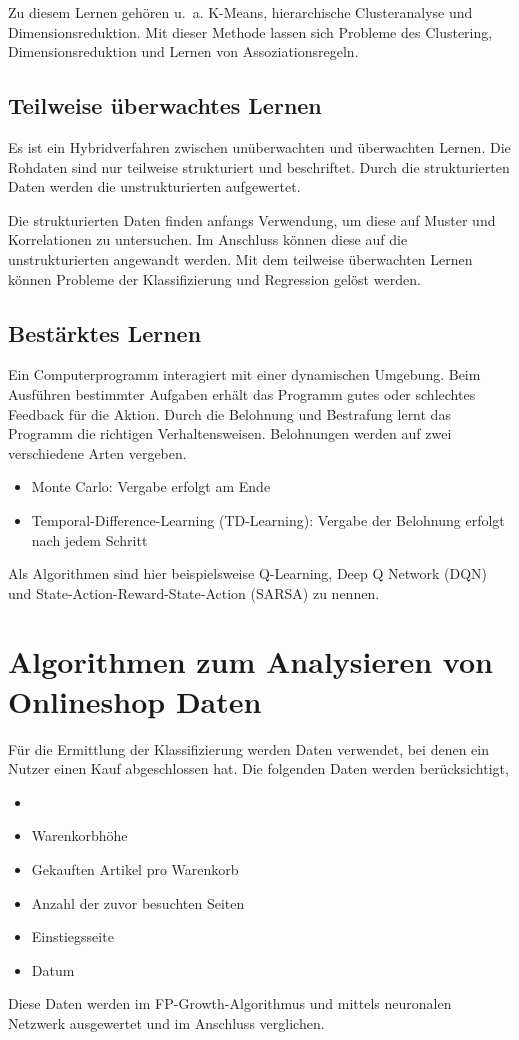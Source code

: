 Zu diesem Lernen gehören u. a. K-Means, hierarchische Clusteranalyse und Dimensionsreduktion. Mit dieser Methode lassen sich Probleme des Clustering, Dimensionsreduktion und Lernen von Assoziationsregeln.

\subsection{Teilweise überwachtes Lernen}
Es ist ein Hybridverfahren zwischen unüberwachten und überwachten Lernen. Die Rohdaten sind nur teilweise strukturiert und beschriftet. Durch die strukturierten Daten werden die unstrukturierten aufgewertet.\vspace{0.2cm}

Die strukturierten Daten finden anfangs Verwendung, um diese auf Muster und Korrelationen zu untersuchen. Im Anschluss können diese auf die unstrukturierten angewandt werden. Mit dem teilweise überwachten Lernen können Probleme der Klassifizierung und Regression gelöst werden.

\subsection{Bestärktes Lernen}
Ein Computerprogramm interagiert mit einer dynamischen Umgebung. Beim Ausführen bestimmter Aufgaben erhält das Programm gutes oder schlechtes Feedback für die Aktion. Durch die Belohnung und Bestrafung lernt das Programm die richtigen Verhaltensweisen. Belohnungen werden auf zwei verschiedene Arten vergeben.

\begin{itemize}
	\item Monte Carlo: Vergabe erfolgt am Ende
	\item Temporal-Difference-Learning (TD-Learning): Vergabe der Belohnung erfolgt nach jedem Schritt
\end{itemize}

Als Algorithmen sind hier beispielsweise Q-Learning, Deep Q Network (DQN) und State-Action-Reward-State-Action (SARSA) zu nennen.

\section{Algorithmen zum Analysieren von Onlineshop Daten}
Für die Ermittlung der Klassifizierung werden Daten verwendet, bei denen ein Nutzer einen Kauf abgeschlossen hat. Die folgenden Daten werden berücksichtigt,
\begin{itemize}
	\item 
	\item Warenkorbhöhe
	\item Gekauften Artikel pro Warenkorb
	\item Anzahl der zuvor besuchten Seiten
	\item Einstiegsseite
	\item Datum
\end{itemize}
Diese Daten werden im FP-Growth-Algorithmus und mittels neuronalen Netzwerk ausgewertet und im Anschluss verglichen.

